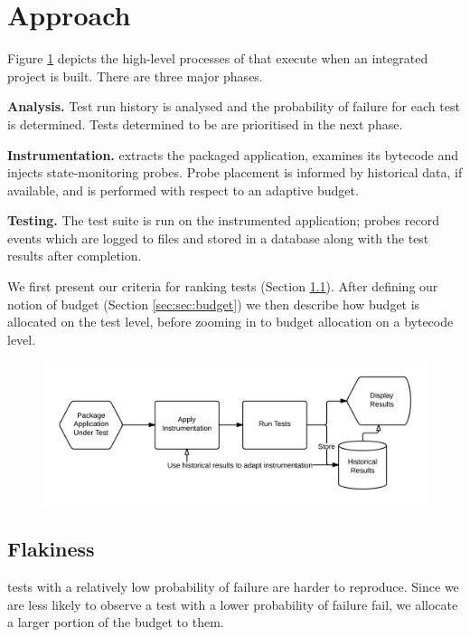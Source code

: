 \section{Approach}
\label{sec:approach}

Figure \ref{fig:architecture_overview} depicts the high-level processes of \splatter{} that execute when an integrated project is built. There are three major phases.

\textbf{Analysis.} Test run history is analysed and the probability of failure for each test is determined. Tests determined to be \flaky{} are prioritised in the next phase.

\textbf{Instrumentation.} \splatter{} extracts the packaged application, examines its bytecode and injects state-monitoring probes. Probe placement is informed by historical data, if available, and is performed with respect to an adaptive budget.

\textbf{Testing.} The test suite is run on the instrumented application; probes record events which are logged to files and stored in a database along with the test results after completion.

We first present our criteria for ranking \flaky{} tests (Section \ref{sec:sec:flakiness}). After defining our notion of budget (Section \ref{sec:sec:budget}) we then describe how budget is allocated on the test level, before zooming in to budget allocation on a bytecode level.

\begin{figure}[h]
\includegraphics[width=\linewidth]{images/architecture_overview}
\caption{}
\label{fig:architecture_overview}
\end{figure}

\subsection{Flakiness}
\label{sec:sec:flakiness}

\Flaky{} tests with a relatively low probability of failure are harder to reproduce. Since we are less likely to observe a test with a lower probability of failure fail, we allocate a larger portion of the budget to them.

